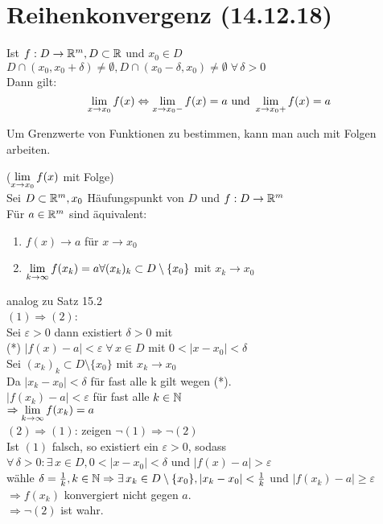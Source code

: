 \documentclass[../ana1u.tex]{subfiles}
\begin{document}
\setcounter{section}{8}

\section{Reihenkonvergenz (14.12.18)}

\begin{bem}
	Ist \(f: D \rightarrow \mathbb{R}^m, D \subset \mathbb{R} \) und \(x_0 \in D\)\\
	\(D \cap (x_0, x_0 + \delta) \neq \emptyset, D \cap (x_0 - \delta, x_0) \neq \emptyset \; \forall \, \delta > 0 \)\\
	Dann gilt:
	\[\lim\limits_{x\rightarrow x_0} f(x) \Leftrightarrow \lim\limits_{x\rightarrow x_0-} f(x) = a \text{ und } \lim\limits_{x\rightarrow x_0+} f(x) = a \]
\end{bem}

Um Grenzwerte von Funktionen zu bestimmen, kann man auch mit Folgen arbeiten.
\begin{satz}
	(\(\lim\limits_{x\rightarrow x_0} f(x) \) mit Folge)\\
	Sei \(D \subset \mathbb{R}^m, x_0 \) Häufungspunkt von \(D\) und \(f: D \rightarrow \mathbb{R}^m\)\\
	Für \(a \in \mathbb{R}^m\) sind äquivalent:
	\begin{enumerate}
		\item \(f(x) \rightarrow a \) für \(x \rightarrow x_0\)
		\item \(\lim\limits_{k\rightarrow\infty} f(x_k) = a \forall (x_k)_k \subset D \setminus \{x_0\} \) mit \(x_k \rightarrow x_0\)
	\end{enumerate}
\end{satz}
\begin{bew}
	analog zu Satz 15.2\\
	\((1) \Rightarrow (2)\):\\
	Sei \(\varepsilon > 0\) dann existiert \(\delta > 0\) mit\\
	(*) \(|f(x) - a| < \varepsilon \; \forall \, x \in D\) mit \(0 < |x - x_0| < \delta\)\\
	Sei \((x_k)_k \subset D \setminus \{x_0\}\) mit \(x_k \rightarrow x_0\)\\
	Da \(|x_k - x_0| < \delta\) für fast alle k gilt wegen (*).\\
	\(|f(x_k) - a| < \varepsilon\) für fast alle \(k \in \mathbb{N}\)\\
	\(\Rightarrow \lim\limits_{k\rightarrow\infty} f(x_k) = a\)\\
	\((2) \Rightarrow (1)\): zeigen \(\lnot (1) \Rightarrow \lnot (2) \)\\
	Ist \((1)\) falsch, so existiert ein \(\varepsilon > 0\), sodass\\
	\(\forall \, \delta > 0: \exists \, x \in D, 0 < |x - x_0| < \delta \) und \(|f(x) - a| > \varepsilon\)\\
	wähle \(\delta = \frac{1}{k}, k \in \mathbb{N} \Rightarrow \exists \, x_k \in D \setminus \{x_0\}, |x_k - x_0| < \frac{1}{k}\) und \(|f(x_k) - a| \geq \varepsilon\)\\
	\(\Rightarrow f(x_k)\) konvergiert nicht gegen \(a\).\\
	\(\Rightarrow \lnot (2)\) ist wahr.
\end{bew}
\end{document}
